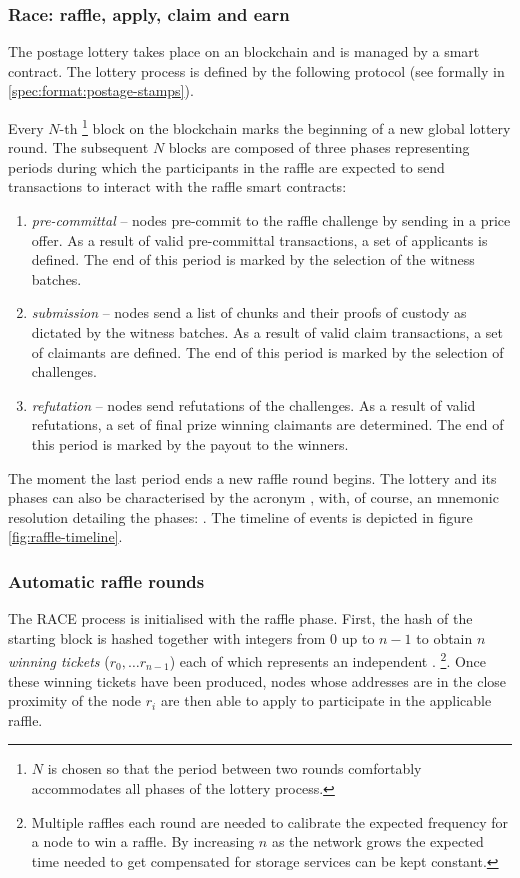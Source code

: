 \subsubsection{Race: raffle, apply, claim and earn}

The postage lottery takes place on an  blockchain and is managed by a smart contract. The lottery process is defined by the following protocol (see formally in \ref{spec:format:postage-stamps}). 

Every $N$-th%
%
\footnote{$N$ is chosen so that the period  between two rounds comfortably accommodates all phases of the lottery process.}
%
block on the blockchain marks the beginning of a new global lottery round.
The subsequent $N$ blocks are composed of three phases representing periods during which the participants in the raffle are expected to send transactions to interact with the raffle smart contracts: 

\begin{enumerate}
\item \emph{pre-committal} -- nodes pre-commit to the raffle challenge by sending in a price offer. As a result of valid pre-committal transactions, a set of applicants is defined. The end of this period is marked by the selection of the witness batches.
\item \emph{submission} -- nodes send a list of chunks and their proofs of custody as dictated by the witness batches. As a result of valid claim transactions, a set of claimants are defined. The end of this period is marked by the selection of challenges.
\item \emph{refutation} -- nodes send refutations of the challenges. As a result of valid refutations, a set of final prize winning claimants are determined. The end of this period is marked by the payout to the winners.
\end{enumerate}

The moment the last period ends a new raffle round begins. The lottery and its phases can also be characterised by the acronym , with, of course, an mnemonic resolution detailing the phases: . The timeline of events is depicted in figure \ref{fig:raffle-timeline}.


\subsubsection{Automatic raffle rounds}

The RACE process is initialised with the raffle phase. First, the hash of the starting block is hashed together with integers from $0$ up to $n-1$ to obtain $n$ \emph{winning tickets} ($r_0, \ldots r_{n-1}$) each of which represents an independent .%
%
\footnote{Multiple raffles each round are needed to calibrate the expected frequency for a node to win a raffle. By increasing $n$ as the network grows the expected time needed to get compensated for storage services can be kept constant.}. 
%
Once these winning tickets have been produced, nodes whose addresses are in the close proximity of the node $r_i$ are then able to apply to participate in the applicable raffle.


